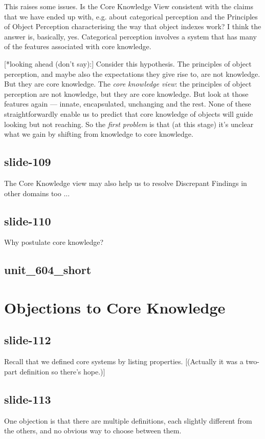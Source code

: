 \documentclass[12pt,\papersize]{extarticle}
\begin{document}
This raises some issues.  Is the Core Knowledge View consistent with the claims that
we have ended up with, e.g. about categorical perception and the Principles of Object
Perception characterising the way that object indexes work?
I think the answer is, basically, yes.  Categorical perception involves a system that has
many of the features associated with core knowledge.

[*looking ahead (don’t say):]
Consider this hypothesis.
The principles of object perception, and maybe also the expectations they give rise to, are not knowledge.
But they are core knowledge.
The \emph{core knowledge view}: the principles of object perception are
not knowledge, but they are core knowledge.
But look at those features again --- innate, encapsulated, unchanging and the rest.
None of these straightforwardly enable us to predict that core knowledge
of objects will guide looking but not reaching.
So the \emph{first problem} is that (at this stage) it's unclear what we
gain by shifting from knowledge to core knowledge.

\subsection{slide-109}
The Core Knowledge view may also help us to resolve
Discrepant Findings in other domains too ...
\subsection{slide-110}
Why postulate core knowledge?

\subsection{unit\_604\_short}


\section{Objections to Core Knowledge}

\subsection{slide-112}
Recall that we defined core systems by listing properties.
[(Actually it was a two-part definition so there’s hope.)]

\subsection{slide-113}
One objection is that there are multiple definitions, each slightly different
from the others, and no obvious way to choose between them.
\end{document}
